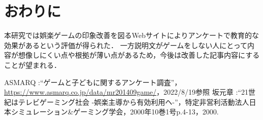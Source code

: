 \documentclass[twocolumn,10pt,a4j]{ltjsarticle}
\begin{document}


\section{おわりに}
本研究では娯楽ゲームの印象改善を図るWebサイトによりアンケートで教育的な効果があるという評価が得られた．
一方説明文がゲームをしない人にとって内容が想像しにくい点や根拠が薄い点があるため，今後は改善した記事内容にすることが望まれる．

\begin{thebibliography}{99}
 ASMARQ :``ゲームと子どもに関するアンケート調査''，\url{https://www.asmarq.co.jp/data/mr201409game/}，2022/8/19参照
 坂元章 :``21世紀はテレビゲーミング社会 -娯楽主導から有効利用ヘ-''，特定非営利活動法人日本シミュレーション\&ゲーミング学会，2000年10巻1号p.4-13，2000.
\end{thebibliography}
\end{document}
